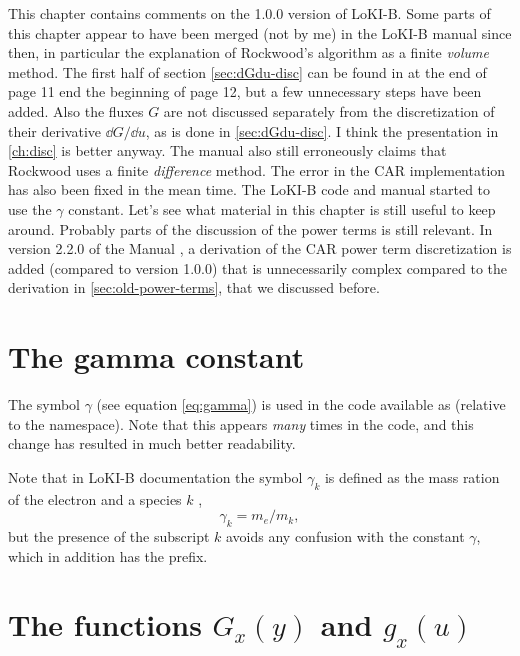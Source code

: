 \documentclass{book}
\begin{document}
This chapter contains comments on the 1.0.0 version of LoKI-B. Some parts of
this chapter appear to have been merged (not by me) in the LoKI-B manual since
then, in particular the explanation of Rockwood's algorithm as a finite {\em volume}
method. The first half of section \ref{sec:dGdu-disc} can be found in \cite{Manual_2_2_0}
at the end of page 11 end the beginning of page 12, but a few unnecessary steps have
been added. Also the fluxes $G$ are not discussed separately from the discretization
of their derivative $\dd{G}/\dd{u}$, as is done in \ref{sec:dGdu-disc}.
I think the presentation in \ref{ch:disc} is better anyway. The manual also
still erroneously claims that Rockwood uses a finite {\em difference} method. The error
in the CAR implementation has also been fixed in the mean time.  The LoKI-B code and
manual started to use the $\gamma$ constant.  Let's see what material in this chapter
is still useful to keep around. Probably parts of the discussion of the power terms
is still relevant. In version 2.2.0 of the Manual \cite[p. 20]{Manual_2_2_0},
a derivation of the CAR power term discretization is added (compared to version 1.0.0)
that is unnecessarily complex compared to the derivation in \ref{sec:old-power-terms},
that we discussed before.

\section{The gamma constant}

\label{sec:gamma-constant}

The symbol $\gamma$ (see equation \eqref{eq:gamma}) is used in the code
available as  (relative to the 
namespace). Note that this appears {\em many} times in the code, and
this change has resulted in much better readability.

Note that in LoKI-B documentation the symbol $\gamma_k$ is
defined as the mass ration of the electron and a species $k$
\cite[below eqn. 9d]{Manual_1_0_0},
\begin{equation}
  \gamma_k = m_e/m_k,
\end{equation}
but the presence of the subscript $k$ avoids any confusion with the
constant $\gamma$, which in addition has the  prefix.

\section{The functions $G_x(y)$ and $g_x(u)$}
\label{sec:G_x,g_x}
\end{document}
